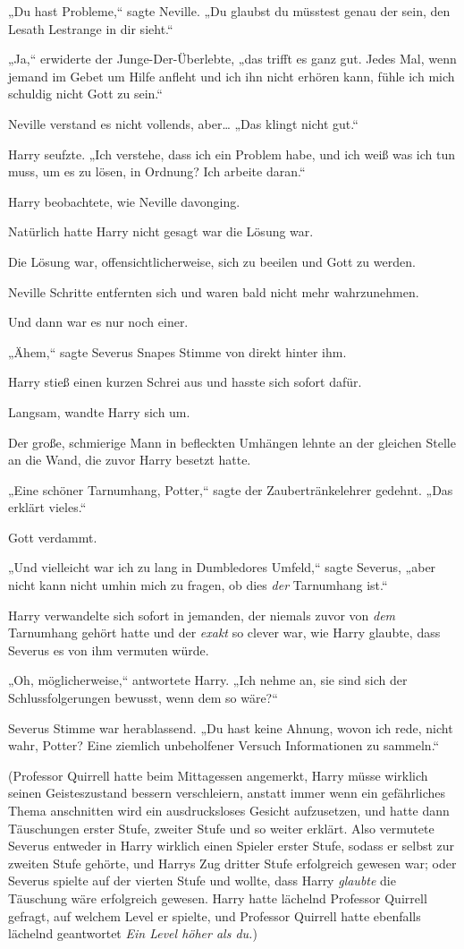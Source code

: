 {„Du hast Probleme,“ sagte Neville. „Du glaubst du müsstest genau der sein, den Lesath Lestrange in dir sieht.“

„Ja,“ erwiderte der Junge-Der-Überlebte, „das trifft es ganz gut. Jedes Mal, wenn jemand im Gebet um Hilfe anfleht und ich ihn nicht erhören kann, fühle ich mich schuldig nicht Gott zu sein.“

Neville verstand es nicht vollends, aber… „Das klingt nicht gut.“

Harry seufzte. „Ich verstehe, dass ich ein Problem habe, und ich weiß was ich tun muss, um es zu lösen, in Ordnung? Ich arbeite daran.“

Harry beobachtete, wie Neville davonging.

Natürlich hatte Harry nicht gesagt war die Lösung war.

Die Lösung war, offensichtlicherweise, sich zu beeilen und Gott zu werden.

Neville Schritte entfernten sich und waren bald nicht mehr wahrzunehmen.

Und dann war es nur noch einer.

„Ähem,“ sagte Severus Snapes Stimme von direkt hinter ihm.

Harry stieß einen kurzen Schrei aus und hasste sich sofort dafür.

Langsam, wandte Harry sich um.

Der große, schmierige Mann in befleckten Umhängen lehnte an der gleichen Stelle an die Wand, die zuvor Harry besetzt hatte.

„Eine schöner Tarnumhang, Potter,“ sagte der Zaubertränkelehrer gedehnt. „Das erklärt vieles.“

Gott verdammt.

„Und vielleicht war ich zu lang in Dumbledores Umfeld,“ sagte Severus, „aber nicht kann nicht umhin mich zu fragen, ob dies \emph{der} Tarnumhang ist.“

Harry verwandelte sich sofort in jemanden, der niemals zuvor von \emph{dem} Tarnumhang gehört hatte und der \emph{exakt} so clever war, wie Harry glaubte, dass Severus es von ihm vermuten würde.

„Oh, möglicherweise,“ antwortete Harry. „Ich nehme an, sie sind sich der Schlussfolgerungen bewusst, wenn dem so wäre?“

Severus Stimme war herablassend. „Du hast keine Ahnung, wovon ich rede, nicht wahr, Potter? Eine ziemlich unbeholfener Versuch Informationen zu sammeln.“

(Professor Quirrell hatte beim Mittagessen angemerkt, Harry müsse wirklich seinen Geisteszustand bessern verschleiern, anstatt immer wenn ein gefährliches Thema anschnitten wird ein ausdrucksloses Gesicht aufzusetzen, und hatte dann Täuschungen erster Stufe, zweiter Stufe und so weiter erklärt. Also vermutete Severus entweder in Harry wirklich einen Spieler erster Stufe, sodass er selbst zur zweiten Stufe gehörte, und Harrys Zug dritter Stufe erfolgreich gewesen war; oder Severus spielte auf der vierten Stufe und wollte, dass Harry \emph{glaubte} die Täuschung wäre erfolgreich gewesen. Harry hatte lächelnd Professor Quirrell gefragt, auf welchem Level er spielte, und Professor Quirrell hatte ebenfalls lächelnd geantwortet \emph{Ein Level höher als du.})

}
